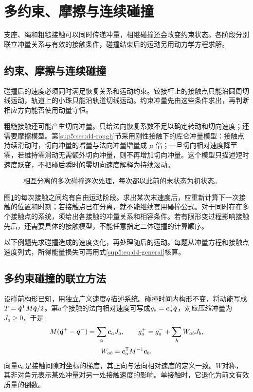 \section{多约束、摩擦与连续碰撞}

支座、绳和粗糙接触可以同时传递冲量，相继碰撞还会改变约束状态。各阶段分别联立冲量关系与有效的接触条件，碰撞结束后的运动另用动力学方程求解。



\subsection{约束、摩擦与连续碰撞}
碰撞后的速度必须同时满足恢复关系和运动约束。铰接杆上的接触点只能沿圆周切线运动，轨道上的小珠只能沿轨道切线运动。约束冲量先由这些条件求出，再判断相应方向能否使用动量守恒。

粗糙接触还可能产生切向冲量。只给法向恢复系数不足以确定转动和切向速度；还需要摩擦模型。第\ref{sup5:sec:d4-rough}节采用刚性接触下的库仑冲量模型：接触点持续滑动时，切向冲量的增量与法向冲量增量成 $\mu$ 倍；一旦切向相对速度降至零，若维持零滑动无需额外切向冲量，则不再增加切向冲量。这个模型只描述短时速度跃变，不把碰后瞬时的零切向速度解释为持续滚动。

\begin{figure}[H]\centering
{}
\caption{相互分离的多次碰撞逐次处理，每次都以此前的末状态为初状态。}\label{sup5:fig:d4-t4}
\end{figure}

图\ref{sup5:fig:d4-t4}的每次接触之间均有自由运动阶段。求出某次末速度后，应重新计算下一次接触的位置和时刻；若接触点已在分离，就不能继续套用碰撞公式。对于同时存在多个接触点的系统，须给出各接触的冲量关系和相容条件。若有限形变过程影响接触先后，还需要具体的接触模型，不能任意指定二体碰撞的计算顺序。

以下例题先求碰撞造成的速度变化，再处理随后的运动。每题从冲量方程和接触点速度列式，所得能量损失可再用式\eqref{sup5:eq:d4-general}核算。


\subsection{多约束碰撞的联立方法}
\label{sec:complete5}
设碰前构形已知，用独立广义速度$\dot{\bm{q}}$描述系统。碰撞时间内构形不变，将动能写成$T=\dot{\bm{q}}^{\mathsf T}M\dot{\bm{q}}/2$。第$a$个接触的法向相对速度可写成$g_a=\bm{c}_a^{\mathsf T}\dot{\bm{q}}$，对应压缩冲量为$J_a\ge0$，于是
\[
 M(\dot{\bm{q}}^+-\dot{\bm{q}}^-)=\sum_a\bm{c}_aJ_a,
 \qquad
 g_a^+=g_a^-+\sum_b W_{ab}J_b,
\]
\[
 W_{ab}=\bm{c}_a^{\mathsf T}M^{-1}\bm{c}_b.
\]
向量$\bm{c}_a$是接触间隙对坐标的梯度，其正向与法向相对速度的定义一致。$W$对称，其非对角元表示某处冲量对另一处接触速度的影响。单接触时，它退化为前文有效质量的倒数。

